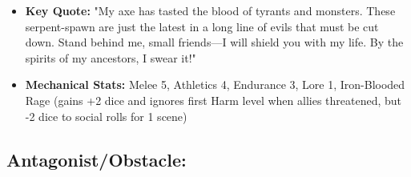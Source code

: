 \documentclass[11pt]{article}
\begin{document}
\begin{itemize}
\begin{itemize}
  \item \textbf{Key Quote:} "My axe has tasted the blood of tyrants and monsters. These serpent-spawn are just the latest in a long line of evils that must be cut down. Stand behind me, small friends—I will shield you with my life. By the spirits of my ancestors, I swear it!"
  \item \textbf{Mechanical Stats:} Melee 5, Athletics 4, Endurance 3, Lore 1, Iron-Blooded Rage (gains +2 dice and ignores first Harm level when allies threatened, but -2 dice to social rolls for 1 scene)
  \end{itemize}
\end{itemize}

\subsection{Antagonist/Obstacle:}
\end{document}
